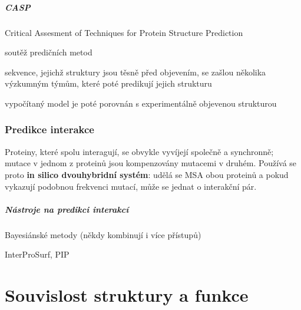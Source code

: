 \documentclass[DIV=8]{scrreprt}
\begin{document}
\paragraph{CASP}
\begin{myItemize}[nosep]
    \item Critical Assesment of Techniques for Protein Structure Prediction
    \item soutěž predičních metod
    \item sekvence, jejichž struktury jsou těsně před objevením, se zašlou několika výzkumným týmům, které poté predikují jejich strukturu
    \item vypočítaný model je poté porovnán s experimentálně objevenou strukturou
\end{myItemize}



\subsection{Predikce interakce} \label{Predikce interakce}


Proteiny, které spolu interagují, se obvykle vyvíjejí společně a synchronně; mutace v jednom z proteinů jsou kompenzovány mutacemi v druhém. Používá se proto \textbf{in silico dvouhybridní systém}: udělá se MSA obou proteinů a pokud vykazují podobnou frekvenci mutací, může se jednat o interakční pár.

\paragraph{Nástroje na predikci interakcí}
\begin{myItemize}[nosep]
    \item Bayesiánské metody (někdy kombinují i více přístupů)
    \item InterProSurf, PIP
\end{myItemize}




\chapter{Souvislost struktury a funkce} \label{Souvislost struktury a funkce}
\end{document}
